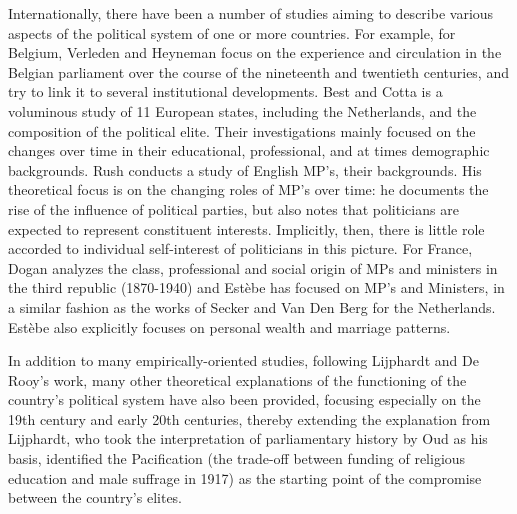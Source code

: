     Internationally, there have been a number of studies aiming to describe various aspects of the political system of one or more countries. For example, for Belgium, Verleden and Heyneman focus on the experience and circulation in the Belgian parliament over the course of the nineteenth and twentieth centuries, and try to link it to several institutional developments.\autocite{verleden2008parlementaire} Best and Cotta is a voluminous study of 11 European states, including the Netherlands, and the composition of the political elite.\autocite{best2000parliamentary} Their investigations mainly focused on the changes over time in their educational, professional, and at times demographic backgrounds. Rush conducts a study of English MP’s, their backgrounds.\autocite{rush2001role} His theoretical focus is on the changing roles of MP’s over time: he documents the rise of the influence of political parties, but also notes that politicians are expected to represent constituent interests. Implicitly, then, there is little role accorded to individual self-interest of politicians in this picture. For France, Dogan analyzes the class, professional and social origin of MPs and ministers in the third republic (1870-1940) and Estèbe has focused on MP’s and Ministers, in a similar fashion as the works of Secker and Van Den Berg for the Netherlands.\autocite{dogan1967filieres, estebe1982ministres} Estèbe also explicitly focuses on personal wealth and marriage patterns. 

    In addition to many empirically-oriented studies, following Lijphardt and De Rooy’s work, many other theoretical explanations of the functioning of the country’s political system have also been provided, focusing especially on the 19th century and early 20th centuries, thereby extending the explanation from Lijphardt, who took the interpretation of parliamentary history by Oud as his basis, identified the Pacification (the trade-off between funding of religious education and male suffrage in 1917) as the starting point of the compromise between the country’s elites.\autocite{oud1961honderd} 

